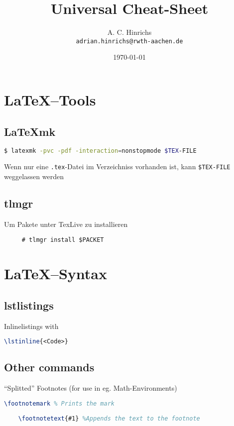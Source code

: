 \documentclass[10pt,landscape,a4paper]{CheatSheet}
\title{Universal Cheat-Sheet}
\author{A. C. Hinrichs\\\texttt{adrian.hinrichs@rwth-aachen.de}}
\date{\today}
\begin{document}
\begin{multicols}{4}
  \setlength{\premulticols}{1pt}
  \setlength{\postmulticols}{1pt}
  \setlength{\multicolsep}{1pt}
  \setlength{\columnsep}{2pt}
  \maketitle
  \section{\LaTeX--Tools}
  \subsection{\LaTeX{}mk}
  \begin{lstlisting}[language=bash]
    $ latexmk -pvc -pdf -interaction=nonstopmode $TEX-FILE
  \end{lstlisting} %
  
  Wenn nur eine \texttt{.tex}-Datei im Verzeichniss vorhanden ist, kann \texttt{\$TEX-FILE}%
  weggelassen werden\\
  \subsection{tlmgr}
  Um Pakete unter TexLive zu installieren
  \begin{lstlisting}
     # tlmgr install $PACKET
  \end{lstlisting} %
  \section{\LaTeX--Syntax}
  \subsection{lstlistings}
  Inlinelistings with
  \begin{lstlisting}[language=tex]
    \lstinline{<Code>}
  \end{lstlisting}
  \subsection{Other commands}
  \enquote{Splitted} Footnotes (for use in eg. Math-Environments)
  \begin{lstlisting}[language=tex]
    \footnotemark % Prints the mark
    
    \footnotetext{#1} %Appends the text to the footnote
  \end{lstlisting}
  

\end{multicols}
\end{document}
